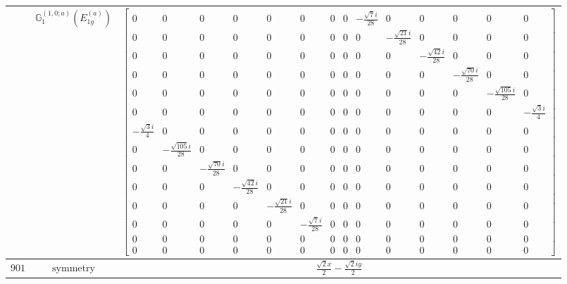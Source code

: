 \documentclass[fleqn,8pt,landscape]{jsarticle}
\begin{document}
\begin{longtable}{ccc}
$  $ & $ \mathbb{G}_{1}^{(1,0;a)}(E_{1g}^{(a)}) $ & $ \begin{bmatrix} 0 & 0 & 0 & 0 & 0 & 0 & 0 & 0 & - \frac{\sqrt{7} i}{28} & 0 & 0 & 0 & 0 & 0 \\ 0 & 0 & 0 & 0 & 0 & 0 & 0 & 0 & 0 & - \frac{\sqrt{21} i}{28} & 0 & 0 & 0 & 0 \\ 0 & 0 & 0 & 0 & 0 & 0 & 0 & 0 & 0 & 0 & - \frac{\sqrt{42} i}{28} & 0 & 0 & 0 \\ 0 & 0 & 0 & 0 & 0 & 0 & 0 & 0 & 0 & 0 & 0 & - \frac{\sqrt{70} i}{28} & 0 & 0 \\ 0 & 0 & 0 & 0 & 0 & 0 & 0 & 0 & 0 & 0 & 0 & 0 & - \frac{\sqrt{105} i}{28} & 0 \\ 0 & 0 & 0 & 0 & 0 & 0 & 0 & 0 & 0 & 0 & 0 & 0 & 0 & - \frac{\sqrt{3} i}{4} \\ - \frac{\sqrt{3} i}{4} & 0 & 0 & 0 & 0 & 0 & 0 & 0 & 0 & 0 & 0 & 0 & 0 & 0 \\ 0 & - \frac{\sqrt{105} i}{28} & 0 & 0 & 0 & 0 & 0 & 0 & 0 & 0 & 0 & 0 & 0 & 0 \\ 0 & 0 & - \frac{\sqrt{70} i}{28} & 0 & 0 & 0 & 0 & 0 & 0 & 0 & 0 & 0 & 0 & 0 \\ 0 & 0 & 0 & - \frac{\sqrt{42} i}{28} & 0 & 0 & 0 & 0 & 0 & 0 & 0 & 0 & 0 & 0 \\ 0 & 0 & 0 & 0 & - \frac{\sqrt{21} i}{28} & 0 & 0 & 0 & 0 & 0 & 0 & 0 & 0 & 0 \\ 0 & 0 & 0 & 0 & 0 & - \frac{\sqrt{7} i}{28} & 0 & 0 & 0 & 0 & 0 & 0 & 0 & 0 \\ 0 & 0 & 0 & 0 & 0 & 0 & 0 & 0 & 0 & 0 & 0 & 0 & 0 & 0 \\ 0 & 0 & 0 & 0 & 0 & 0 & 0 & 0 & 0 & 0 & 0 & 0 & 0 & 0 \end{bmatrix} $ \\ \hline
$ 901 $ & $ \text{symmetry} $ & $ \frac{\sqrt{2} x}{2} - \frac{\sqrt{2} i y}{2} $ \\

\end{longtable}
\end{document}
